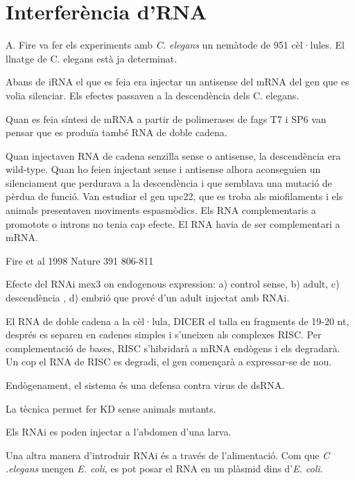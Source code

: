\section{Interferència d'RNA}
\label{sec:interferencia-drna}

A. Fire va fer els experiments amb \textit{C. elegans} un nemàtode de 951 cèl·lules. El llnatge de C. elegans està ja determinat.

Abans de iRNA el que es feia era injectar un antisense del mRNA del gen que es volia silenciar. Els efectes passaven a la descendència dels C. elegans.

Quan es feia síntesi de mRNA a partir de polimerases de fags T7 i SP6 van pensar que es produïa també RNA de doble cadena.

Quan injectaven RNA de cadena senzilla sense o antisense, la descendència era wild-type.
Quan ho feien injectant sense i antisense alhora aconseguien un silenciament que perdurava a la descendència i que semblava una mutació de pèrdua de funció. Van estudiar el gen upc22, que es troba als miofilaments i els animals presentaven moviments espasmòdics. Els RNA complementaris a promotots o introns no tenia cap efecte. El RNA havia de ser complementari a mRNA.

Fire et al 1998 Nature 391 806-811

Efecte del RNAi mex3 on endogenous expression: a) control sense, b) adult, c) descendència , d) embrió que prové d'un adult injectat amb RNAi. 

El RNA de doble cadena a la cèl·lula, DICER el talla en fragments de 19-20 nt, després es separen en cadenes simples i s'uneixen als complexes RISC. Per complementació de bases, RISC s'hibridarà a mRNA endògens i els degradarà. Un cop el RNA de RISC es degradi, el gen començarà a expressar-se de nou.

Endògenament, el sistema és una defensa contra virus de dsRNA.

La tècnica permet fer KD sense animals mutants.

Els RNAi es poden injectar a l'abdomen d'una larva.

Una altra manera d'introduir RNAi és a través de l'alimentació. Com que \textit{C .elegans} mengen \textit{E. coli}, es pot posar el RNA en un plàsmid dins d'\textit{E. coli}.